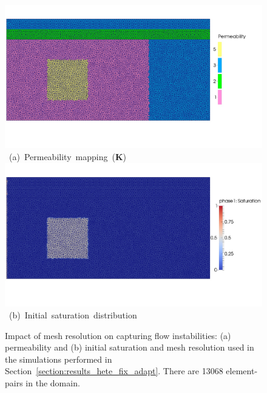 \begin{figure}[ht] 
\vbox{
\hbox{\hspace{1cm}
\includegraphics[width=\textwidth]{./Pics1/Section4_4/Five_regions_adapt_MeshPerm.pdf}}
\vspace{-1.0cm}
\hbox{\hspace{3.5cm} (a) Permeability mapping ({\bf K})}
\vspace{0.0cm}
\hbox{\hspace{1cm}
\includegraphics[width=\textwidth]{./Pics1/Section4_4/Five_regions_adapt_MeshSat1.pdf}}
\vspace{-1.0cm}
\hbox{\hspace{3.5cm} (b) Initial saturation distribution}}
\caption{Impact of mesh resolution on capturing flow instabilities: (a) permeability and (b) initial saturation and  mesh resolution used in the simulations performed in Section~\ref{section:results_hete_fix_adapt}. There are 13068  element-pairs in the domain.}
\label{fig:testcase_heter_domain}
\end{figure}
\clearpage



